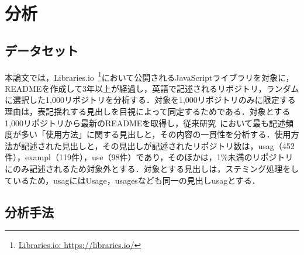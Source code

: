\documentclass[uplatex,dvipdfmx,a4paper,twocolumn,base=11pt,jbase=11pt,ja=standard]{bxjsarticle}  %
\newcommand{\todo}[1]{\colorbox{yellow}{{\bf TODO}:}{\color{red} {\textbf{[#1]}}}}
\begin{document}
\section{分析}


\subsection{データセット}


本論文では，Libraries.io~\footnote{\url{Libraries.io: https://libraries.io/}}において公開されるJavaScriptライブラリを対象に，READMEを作成して3年以上が経過し，英語で記述されるリポジトリ，ランダムに選択した1,000リポジトリを分析する．対象を1,000リポジトリのみに限定する理由は，表記揺れする見出しを目視によって同定するためである．対象とする1,000リポジトリから最新のREADMEを取得し，従来研究~\cite{IEICE2019_Ikeda}において最も記述頻度が多い「使用方法」に関する見出しと，その内容の一貫性を分析する．使用方法が記述された見出しと，その見出しが記述されたリポジトリ数は，usag（452件），exampl（119件），use（98件）であり，そのほかは，1\%未満のリポジトリにのみ記述されるため対象外とする．対象とする見出しは，ステミング処理をしているため，usagにはUsage，usagesなども同一の見出しusagとする．





\subsection{分析手法}
\end{document}
